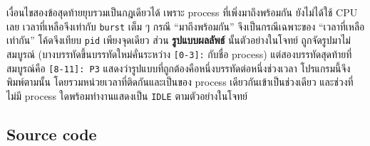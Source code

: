 \documentclass[a4paper,11pt]{article}
\newcommand{\code}[1]{\texttt{#1}}
\begin{document}
เงื่อนไขสองข้อสุดท้ายยุบรวมเป็นกฎเดียวได้ เพราะ process ที่เพิ่งมาถึงพร้อมกัน
ยังไม่ได้ใช้ CPU เลย เวลาที่เหลือจึงเท่ากับ \code{burst} เต็ม ๆ กรณี
``มาถึงพร้อมกัน'' จึงเป็นกรณีเฉพาะของ ``เวลาที่เหลือเท่ากัน'' โค้ดจึงเทียบ
\code{pid} เพียงจุดเดียว ส่วน \textbf{รูปแบบผลลัพธ์} นั้นตัวอย่างในโจทย์
ถูกจัดรูปมาไม่สมบูรณ์ (บางบรรทัดขึ้นบรรทัดใหม่คั่นระหว่าง \code{[0-3]:}
กับชื่อ process) แต่สองบรรทัดสุดท้ายที่สมบูรณ์คือ \code{[8-11]: P3}
แสดงว่ารูปแบบที่ถูกต้องคือหนึ่งบรรทัดต่อหนึ่งช่วงเวลา โปรแกรมนี้จึงพิมพ์ตามนั้น
โดยรวมหน่วยเวลาที่ติดกันและเป็นของ process เดียวกันเข้าเป็นช่วงเดียว
และช่วงที่ไม่มี process ใดพร้อมทำงานแสดงเป็น \code{IDLE} ตามตัวอย่างในโจทย์

\subsection{Source code}
\end{document}
